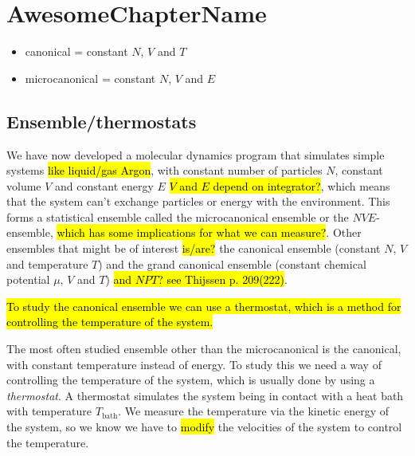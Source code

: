 \chapter{AwesomeChapterName}

\begin{itemize}
    \item canonical = constant $N$, $V$ and $T$
    \item microcanonical = constant $N$, $V$ and $E$
\end{itemize}


\section{Ensemble/thermostats}
We have now developed a molecular dynamics program that simulates simple systems \hl{like liquid/gas Argon}, with constant number of particles $N$, constant volume $V$ and constant energy $E$ \hl{$V$ and $E$ depend on integrator?}, which means that the system can't exchange particles or energy with the environment. This forms a statistical ensemble called the microcanonical ensemble or the $NVE$-ensemble, \hl{which has some implications for what we can measure?}. Other ensembles that might be of interest \hl{is/are?} the canonical ensemble (constant $N$, $V$ and temperature $T$) and the grand canonical ensemble (constant chemical potential $\mu$, $V$ and $T$) \hl{and $NPT$? see Thijssen p. 209(222)}.

\hl{To study the canonical ensemble we can use a thermostat, which is a method for controlling the temperature of the system.} 

The most often studied ensemble other than the microcanonical is the canonical, with constant temperature instead of energy. To study this we need a way of controlling the temperature of the system, which is usually done by using a \emph{thermostat}. A thermostat simulates the system being in contact with a heat bath with temperature $T_\text{bath}$.  We measure the temperature via the kinetic energy of the system, so we know we have to \hl{modify} the velocities of the system to control the temperature. 


